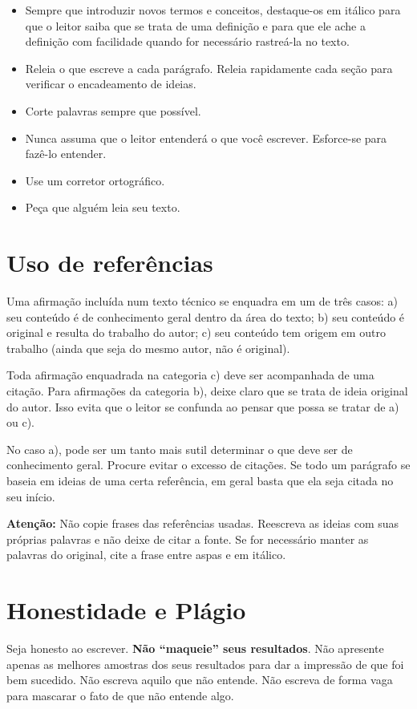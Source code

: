 \begin{itemize}
\item Sempre que introduzir novos termos e conceitos, destaque-os em itálico para que o leitor saiba que se trata de uma definição e para que ele ache a definição com facilidade quando for necessário rastreá-la no texto.
\item Releia o que escreve a cada parágrafo. Releia rapidamente cada seção para verificar o encadeamento de ideias.
\item Corte palavras sempre que possível.
\item Nunca assuma que o leitor entenderá o que você escrever. Esforce-se para fazê-lo entender.
\item Use um corretor ortográfico.
\item Peça que alguém leia seu texto.
\end{itemize}


\section{Uso de referências}
\label{sec:comocitar}

Uma afirmação incluída num texto técnico se enquadra em um de três casos: a) seu conteúdo é de conhecimento geral dentro da área do texto; b) seu conteúdo é original e resulta do trabalho do autor; c) seu conteúdo tem origem em outro trabalho (ainda que seja do mesmo autor, não é original).

Toda afirmação enquadrada na categoria c) deve ser acompanhada de uma citação. Para afirmações da categoria b), deixe claro que se trata de ideia original do autor. Isso evita que o leitor se confunda ao pensar que possa se tratar de a) ou c).

No caso a), pode ser um tanto mais sutil determinar o que deve ser de conhecimento geral. Procure evitar o excesso de citações. Se todo um parágrafo se baseia em ideias de uma certa referência, em geral basta que ela seja citada no seu início.

\textbf{Atenção:} Não copie frases das referências usadas. Reescreva as ideias com suas próprias palavras e não deixe de citar a fonte. Se for necessário manter as palavras do original, cite a frase entre aspas e em itálico.

\section{Honestidade e Plágio}

Seja honesto ao escrever. \textbf{Não ``maqueie'' seus resultados}. Não apresente apenas as melhores amostras dos seus resultados para dar a impressão de que foi bem sucedido. Não escreva aquilo que não entende. Não escreva de forma vaga para mascarar o fato de que não entende algo.

